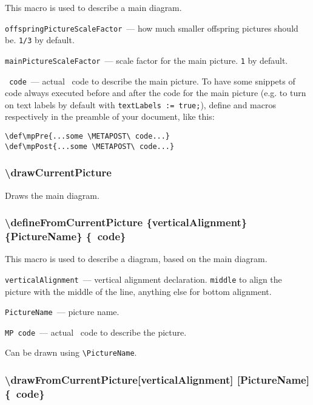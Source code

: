 	This macro is used to describe a main diagram.

	\texttt{offspringPictureScaleFactor}~— how much smaller offspring pictures should be. \texttt{1/3} by default.
	
	\texttt{mainPictureScaleFactor}~— scale factor for the main picture. \texttt{1} by default.
	
	\texttt{\METAPOST\ code}~— actual \METAPOST\ code to describe the main picture. To have some snippets of code always executed before and after the code for the main picture (e.g. to turn on text labels by default with \texttt{textLabels := true;}), define  and  macros respectively in the preamble of your document, like this:
	
\begin{lstlisting}
\def\mpPre{...some \METAPOST\ code...}
\def\mpPost{...some \METAPOST\ code...}
\end{lstlisting}


\subsubsection{\textbackslash drawCurrentPicture}
	
	Draws the main diagram.




\subsubsection{\textbackslash defineFromCurrentPicture \{verticalAlignment\} \{PictureName\} \{\METAPOST\ code\}}

	This macro is used to describe a diagram, based on the main diagram.

	\texttt{verticalAlignment}~— vertical alignment declaration. \texttt{middle} to align the picture with the middle of the line, anything else for bottom alignment.

	\texttt{PictureName}~— picture name.

	\texttt{MP code}~— actual \METAPOST\ code to describe the picture.
	
	Can be drawn using \texttt{\textbackslash PictureName}.
	
\subsubsection{\textbackslash drawFromCurrentPicture[verticalAlignment] [PictureName] \{\METAPOST\ code\}}

